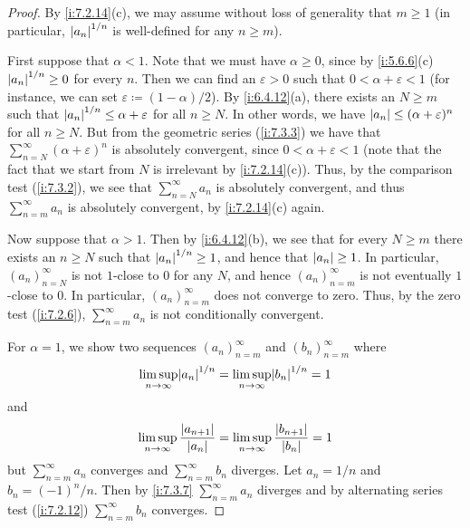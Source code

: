 \begin{proof}
  By \cref{i:7.2.14}(c), we may assume without loss of generality that \(m \geq 1\)
  (in particular, \(\left\lvert a_n\right\rvert^{1 / n}\) is well-defined for any \(n \geq m\)).

  First suppose that \(\alpha < 1\).
  Note that we must have \(\alpha \geq 0\), since by \cref{i:5.6.6}(c) \(\left\lvert a_n\right\rvert^{1 / n} \geq 0\) for every \(n\).
  Then we can find an \(\varepsilon > 0\) such that \(0 < \alpha + \varepsilon < 1\) (for instance, we can set \(\varepsilon \coloneqq (1 - \alpha) / 2\)).
  By \cref{i:6.4.12}(a), there exists an \(N \geq m\) such that \(\left\lvert a_n\right\rvert^{1 / n} \leq \alpha + \varepsilon\) for all \(n \geq N\).
  In other words, we have \(\left\lvert a_n\right\rvert \leq (\alpha + \varepsilon)^n\) for all \(n \geq N\).
  But from the geometric series (\cref{i:7.3.3}) we have that \(\sum_{n = N}^\infty (\alpha + \varepsilon)^n\) is absolutely convergent, since \(0 < \alpha + \varepsilon < 1\)
  (note that the fact that we start from \(N\) is irrelevant by \cref{i:7.2.14}(c)).
  Thus, by the comparison test (\cref{i:7.3.2}), we see that \(\sum_{n = N}^\infty a_n\) is absolutely convergent, and thus \(\sum_{n = m}^\infty a_n\) is absolutely convergent, by \cref{i:7.2.14}(c) again.

  Now suppose that \(\alpha > 1\).
  Then by \cref{i:6.4.12}(b), we see that for every \(N \geq m\) there exists an \(n \geq N\) such that \(\left\lvert a_n\right\rvert^{1 / n} \geq 1\), and hence that \(\left\lvert a_n\right\rvert \geq 1\).
  In particular, \((a_n)_{n = N}^\infty\) is not \(1\)-close to \(0\) for any \(N\), and hence \((a_n)_{n = m}^\infty\) is not eventually \(1\)-close to \(0\).
  In particular, \((a_n)_{n = m}^\infty\) does not converge to zero.
  Thus, by the zero test (\cref{i:7.2.6}), \(\sum_{n = m}^\infty a_n\) is not conditionally convergent.

  For \(\alpha = 1\), we show two sequences \((a_n)_{n = m}^\infty\) and \((b_n)_{n = m}^\infty\) where
  \[
    \limsup_{n \to \infty} \abs{a_n}^{1 / n} = \limsup_{n \to \infty} \abs{b_n}^{1 / n} = 1
  \]
  and
  \[
    \limsup_{n \to \infty} \dfrac{\left\lvert a_{n + 1}\right\rvert}{\left\lvert a_n\right\rvert} = \limsup_{n \to \infty} \dfrac{\left\lvert b_{n + 1}\right\rvert}{\left\lvert b_n\right\rvert} = 1
  \]
  but \(\sum_{n = m}^\infty a_n\) converges and \(\sum_{n = m}^\infty b_n\) diverges.
  Let \(a_n = 1 / n\) and \(b_n = (-1)^n / n\).
  Then by \cref{i:7.3.7} \(\sum_{n = m}^\infty a_n\) diverges and by alternating series test (\cref{i:7.2.12}) \(\sum_{n = m}^\infty b_n\) converges.


\end{proof}
